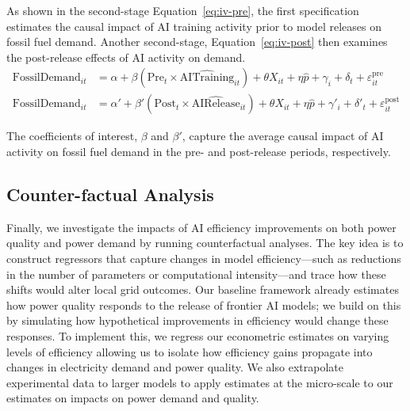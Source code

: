\documentclass[sigconf,authordraft]{acmart}
\begin{document}
As shown in the second-stage Equation~\ref{eq:iv-pre}, the first specification estimates the causal impact of AI training activity prior to model releases on fossil fuel demand. Another second-stage, Equation~\ref{eq:iv-post} then examines the post-release effects of AI activity on demand. 
\begin{align}
\text{FossilDemand}_{it} &= \alpha 
+ \beta \left( \text{Pre}_{t} \times \widehat{\text{AITraining}}_{it} \right)
+\theta X_{it}+\eta\hat{p}+ \gamma_i + \delta_t + \varepsilon^{\text{pre}}_{it}
\label{eq:iv-pre} \\
\text{FossilDemand}_{it} &= \alpha' 
+ \beta' \left( \text{Post}_{t} \times \widehat{\text{AIRelease}}_{it} \right)
+\theta X_{it}+\eta\hat{p}+ \gamma'_i + \delta'_t + \varepsilon^{\text{post}}_{it}
\label{eq:iv-post}
\end{align}

The coefficients of interest, $\beta$ and $\beta'$, capture the average causal impact of AI activity on fossil fuel demand in the pre- and post-release periods, respectively. %

\subsection{Counter-factual Analysis}%

Finally, we investigate the impacts of AI efficiency improvements on both power quality and power demand by running counterfactual analyses. The key idea is to construct regressors that capture changes in model efficiency—such as reductions in the number of parameters or computational intensity—and trace how these shifts would alter local grid outcomes. Our baseline framework already estimates how power quality responds to the release of frontier AI models; we build on this by simulating how hypothetical improvements in efficiency would change these responses. To implement this, we regress our econometric estimates on varying levels of efficiency allowing us to isolate how efficiency gains propagate into changes in electricity demand and power quality. We also extrapolate experimental data to larger models to apply estimates at the micro-scale to our estimates on impacts on power demand and quality.

\end{document}
